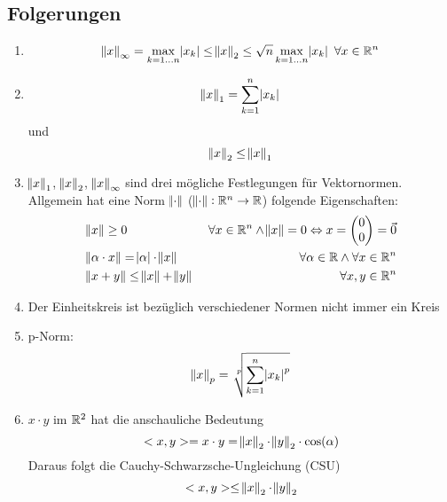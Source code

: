 \subsection{Folgerungen}
\begin{enumerate}
    \item
        \begin{equation*}
            \norm{x}_\infty = \max_{k=1\ldots n} \abs{x_k}
            \leq \norm{x}_2 \leq \sqrt{n} \max_{k=1 \ldots n} \abs{x_k}
            \ \forall x \in \mathbb{R}^n
        \end{equation*}
    \item
        \begin{equation*}
            \norm{x}_1 = \sum_{k=1}^n \abs{x_k}
        \end{equation*}
        und
        \begin{equation*}
            \norm{x}_2 \leq \norm{x}_1
        \end{equation*}
    \item $\norm{x}_1$, $\norm{x}_2$, $\norm{x}_\infty$ sind drei mögliche Festlegungen
        für Vektornormen. Allgemein hat eine Norm $\norm{\cdot}$
        ($\norm{\cdot}: \mathbb{R}^n \rightarrow \mathbb{R}$) folgende Eigenschaften:
        \begin{eqnarray*}
            &\norm{x} \geq 0&\ \forall x \in \mathbb{R}^n \land \norm{x}=0 \Leftrightarrow
            x = \begin{pmatrix}
            0 \\ 0
            \end{pmatrix}
            = \vec{0} \\
            &\norm{\alpha \cdot x} = \abs{\alpha} \cdot \norm{x}&\ \forall \alpha
            \in \mathbb{R}\land \forall x \in \mathbb{R}^n \\
            &\norm{x + y} \leq \norm{x} + \norm{y}&\ \forall x, y \in \mathbb{R}^n
        \end{eqnarray*}
    \item Der Einheitskreis ist bezüglich verschiedener Normen nicht immer ein Kreis
    \item p-Norm:
        \begin{equation*}
            \norm{x}_p = \nthSqrt{p}{\sum_{k=1}^n \abs{x_k}^p}
        \end{equation*}
     \item $x \cdot y$ im $\mathbb{R}^2$ hat die anschauliche Bedeutung
        \begin{equation*}
            <x,y> = x \cdot y = \norm{x}_2 \cdot \norm{y}_2 \cdot \cos(\alpha)
        \end{equation*}
        Daraus folgt die Cauchy-Schwarzsche-Ungleichung (CSU)
        \begin{equation*}
            <x,y> \leq \norm{x}_2 \cdot \norm{y}_2
        \end{equation*}
\end{enumerate}

